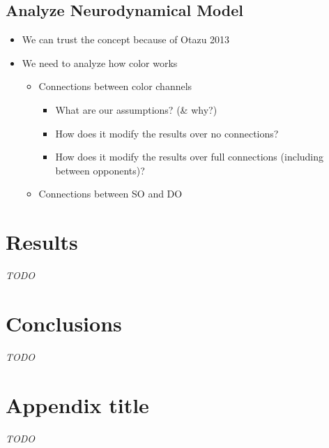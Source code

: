 \documentclass[journal,onecolumn]{IEEEtran}
\begin{document}
\subsection*{Analyze Neurodynamical Model}
\begin{itemize}
    \item We can trust the concept because of Otazu 2013
    \item We need to analyze how color works
    \begin{itemize}
        \item Connections between color channels
        \begin{itemize}
            \item What are our assumptions? (\& why?)
            \item How does it modify the results over no connections?
            \item How does it modify the results over full connections (including between opponents)?
        \end{itemize}
        \item Connections between SO and DO
    \end{itemize}
\end{itemize}



%
%
%
\section{Results}

\textit{TODO}


%
%
%
\section{Conclusions}

\textit{TODO}


\appendices
\section{Appendix title}
\textit{TODO}
\end{document}
